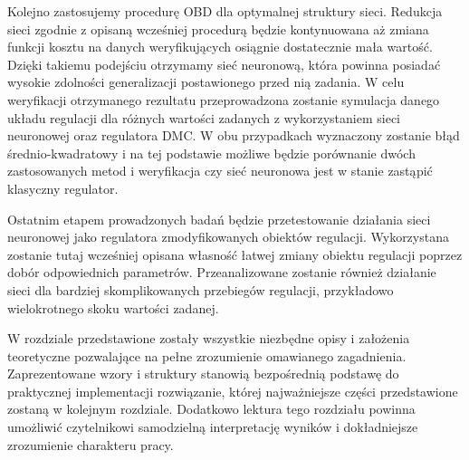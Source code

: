 \par Kolejno zastosujemy procedurę OBD dla optymalnej struktury sieci. Redukcja sieci zgodnie z opisaną wcześniej procedurą będzie kontynuowana aż zmiana funkcji kosztu na danych weryfikujących osiągnie dostatecznie mała wartość. Dzięki takiemu podejściu otrzymamy sieć neuronową, która powinna posiadać wysokie zdolności generalizacji postawionego przed nią zadania. W celu weryfikacji otrzymanego rezultatu przeprowadzona zostanie symulacja danego układu regulacji dla różnych wartości zadanych z wykorzystaniem sieci neuronowej oraz regulatora DMC. W obu przypadkach wyznaczony zostanie błąd średnio-kwadratowy i na tej podstawie możliwe będzie porównanie dwóch zastosowanych metod i weryfikacja czy sieć neuronowa jest w stanie zastąpić klasyczny regulator.
\par Ostatnim etapem prowadzonych badań będzie przetestowanie działania sieci neuronowej jako regulatora zmodyfikowanych obiektów regulacji. Wykorzystana zostanie tutaj wcześniej opisana własność łatwej zmiany obiektu regulacji poprzez dobór odpowiednich parametrów. Przeanalizowane zostanie również działanie sieci dla bardziej skomplikowanych przebiegów regulacji, przykładowo wielokrotnego skoku wartości zadanej.
\vspace{10mm}
\par W rozdziale przedstawione zostały wszystkie niezbędne opisy i założenia teoretyczne pozwalające na pełne zrozumienie omawianego zagadnienia. Zaprezentowane wzory i struktury stanowią bezpośrednią podstawę do praktycznej implementacji rozwiązanie, której najważniejsze części przedstawione zostaną w kolejnym rozdziale. Dodatkowo lektura tego rozdziału powinna umożliwić czytelnikowi samodzielną interpretację wyników i dokładniejsze zrozumienie charakteru pracy.   
      


